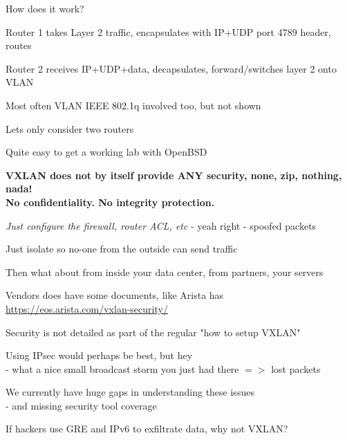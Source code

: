 \documentclass[16pt,landscape,a4paper,footrule]{foils}
\begin{document}


How does it work?

\begin{list2}
\item Router 1 takes Layer 2 traffic, encapsulates with IP+UDP port 4789 header, routes
\item Router 2 receives IP+UDP+data, decapsulates, forward/switches layer 2 onto VLAN
\item Most often VLAN IEEE 802.1q involved too, but not shown
\item Lets only consider two routers
\end{list2}

\vskip 5mm
\centerline{Quite easy to get a working lab with OpenBSD \smiley}


{\bf VXLAN does not by itself provide ANY security, none, zip, nothing, nada! \\
No confidentiality. No integrity protection.}



\begin{list2}
\item \emph{Just configure the firewall, router ACL, etc} - yeah right - spoofed packets
\item Just isolate so no-one from the outside can send traffic
\item Then what about from inside your data center, from partners, your servers
\item Vendors does have some documents, like Arista has\\ \url{https://eos.arista.com/vxlan-security/}
\item Security is not detailed as part of the regular "how to setup VXLAN"
\item Using IPsec would perhaps be best, but hey \\
- what a nice small broadcast storm you just had there $=>$ lost packets
\end{list2}


\vskip 1cm
We currently have huge gaps in understanding these issues\\
- and missing security tool coverage

\vskip 5mm

{\small If hackers use GRE and IPv6 to exfiltrate data, why not VXLAN?}

\end{document}
